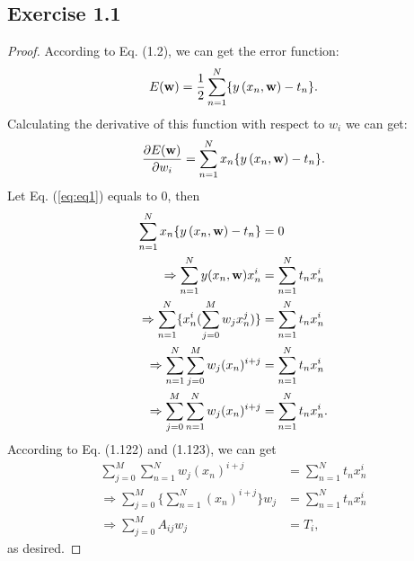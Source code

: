 \documentclass[11pt]{article}
\theoremstyle{definition}
\begin{document}
\subsection{Exercise 1.1}
\begin{proof}
According to Eq. (1.2), we can get the error function:
\begin{equation*}
E(\bold{w}) = \frac{1}{2}\sum^{N}_{n=1} \{ y\left(x_n,\bold{w}\right) - t_n \}.
\end{equation*}
Calculating the derivative of this function with respect to $w_i$ we can get:
\begin{equation}
 \frac{\partial E(\bold{w})}{\partial w_i} = \sum^{N}_{n=1}x_n\{y\left(x_n,\bold{w}\right) - t_n\}.  \label{eq:eq1} 
\end{equation}
Let Eq. (\ref{eq:eq1}) equals to 0, then
\begin{equation*}
\begin{aligned}
\sum^{N}_{n=1}x_n\{y\left(x_n,\bold{w}\right) - t_n\} &= 0 \\
\Rightarrow\sum^N_{n=1}y(x_n,\bold{w})x_n^i &= \sum^N_{n=1}t_nx_n^i \\
\Rightarrow\sum^N_{n=1}\{x_n^i(\sum^M_{j=0}w_jx_n^j)\} &= \sum^N_{n=1}t_nx_n^i \\
\Rightarrow\sum^N_{n=1}\sum^M_{j=0}w_j(x_n)^{i+j} &= \sum^N_{n=1}t_nx_n^i \\
\Rightarrow\sum^M_{j=0}\sum^N_{n=1}w_j(x_n)^{i+j} &= \sum^N_{n=1}t_nx_n^i.
\end{aligned}
\end{equation*}
According to Eq. (1.122) and (1.123), we can get
\begin{equation*}
\begin{aligned}
\sum^M_{j=0}\sum^N_{n=1}w_j(x_n)^{i+j} &= \sum^N_{n=1}t_nx_n^i \\
\Rightarrow\sum^M_{j=0}\{\sum^N_{n=1}(x_n)^{i+j}\}w_j &= \sum^N_{n=1}t_nx_n^i \\
\Rightarrow\sum^M_{j=0}A_{ij}w_j &= T_i,
\end{aligned}
\end{equation*}
as desired.
\end{proof}
\end{document}
